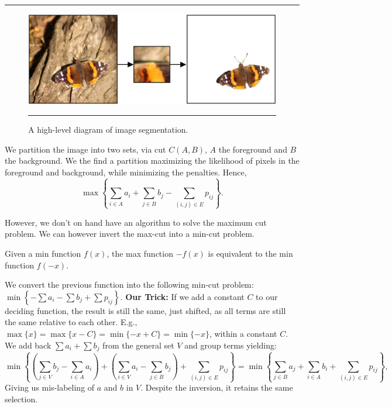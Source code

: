 \vspace{-1em}
\noindent\rule{\textwidth}{0.4pt}

\begin{figure}[h]
    \centering
    \includegraphics[width=.7\textwidth]{Sections/net/butterfly.png}
    \noindent\rule{\textwidth}{0.4pt}
    \caption{A high-level diagram of image segmentation.}
    \label{fig:butterfly}
\end{figure}

\noindent
We partition the image into two sets, via cut $C(A,B)$, $A$ the foreground and $B$ the background.
We the find a partition maximizing the likelihood of pixels in the foreground and background, while minimizing the penalties.
Hence, 
$$\displaystyle\max\left\{\sum_{i\in A} a_i + \sum_{j\in B} b_j - \sum_{(i,j)\in E} p_{ij}\right\}.$$

\noindent
However, we don't on hand have an algorithm to solve the maximum cut problem. We can however invert the max-cut into a min-cut problem.
\begin{theo}

    Given a min function $f(x)$, the max function $-f(x)$ is equivalent to the min function $f(-x)$.
\end{theo}
We convert the previous function into the following min-cut problem: 
$\displaystyle\min\left\{-\sum a_i - \sum b_j + \sum p_{ij}\right\}.$ 
\textbf{Our Trick:} If we add a constant $C$ to our deciding function, the result is still the same, just shifted,
as all terms are still the same relative to each other. E.g., $\max\{x\} = \max\{x-C\}= \min\{-x+C\}= \min\{-x\}$, within a constant $C$.
We add back $\sum a_i + \sum b_j$ from the general set $V$ and group terms yielding:
$$\min\left\{\left(\sum_{j\in V} b_j - \sum_{i\in A} a_i \right) + \left(\sum_{i\in V} a_i - \sum_{j\in B} b_j\right) + \sum_{(i,j)\in E} p_{ij}\right\}=
\min\left\{\sum_{j\in B} a_j + \sum_{i\in A} b_i + \sum_{(i,j)\in E} p_{ij}\right\},$$
Giving us mis-labeling of $a$ and $b$ in $V$. Despite the inversion, it retains the same selection.

\newpage

